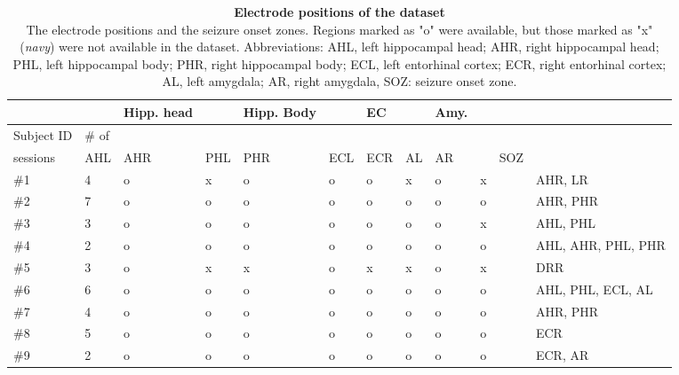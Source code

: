 \documentclass[final,3p,times,twocolumn]{elsarticle}
\begin{document}
\begin{table}[ht]
\centering
\begin{tabular}{|l|l|l|l|l|l|l|l|l|l|l|l|}
\hline
&&Hipp. head&&Hipp. Body&&EC&&Amy.&&&\\
\hline
Subject ID&\# of &&&&&&&&&&\\
\hline
sessions&AHL&AHR&PHL&PHR&ECL&ECR&AL&AR&&SOZ&\\
\hline
\#1&4&o&x&o&o&o&x&o&x&&AHR, LR\\
\hline
\#2&7&o&o&o&o&o&o&o&o&&AHR, PHR\\
\hline
\#3&3&o&o&o&o&o&o&o&x&&AHL, PHL\\
\hline
\#4&2&o&o&o&o&o&o&o&o&&AHL, AHR, PHL, PHR\\
\hline
\#5&3&o&x&x&o&x&x&o&x&&DRR\\
\hline
\#6&6&o&o&o&o&o&o&o&o&&AHL, PHL, ECL, AL\\
\hline
\#7&4&o&o&o&o&o&o&o&o&&AHR, PHR\\
\hline
\#8&5&o&o&o&o&o&o&o&o&&ECR\\
\hline
\#9&2&o&o&o&o&o&o&o&o&&ECR, AR\\
\hline
\bottomrule
\end{tabular}
\caption{\textbf{
Electrode positions of the dataset
}
\smallskip
\\
The electrode positions and the seizure onset zones. Regions marked as "o" were available, but those marked as "x" (\textit{navy}) were not available in the dataset. Abbreviations: AHL, left hippocampal head; AHR, right hippocampal head; PHL, left hippocampal body; PHR, right hippocampal body; ECL, left entorhinal cortex; ECR, right entorhinal cortex; AL, left amygdala; AR, right amygdala, SOZ: seizure onset zone.
}
\end{table}
\clearpage
{}
\end{document}
